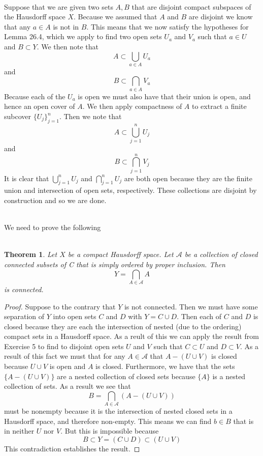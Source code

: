 \documentclass{article}
\newcommand{\problem}[1]{\noindent{\textbf{Problem #1}}\\}
\newtheorem*{thm}{\\ Theorem}
\begin{document}
\problem{3.26.5} Suppose that we are given two sets $A,B$ that are disjoint compact subspaces of the Hausdorff space $X$. Because we assumed that $A$ and $B$ are disjoint we know that any $a \in A$ is not in $B$. This means that we now satisfy the hypotheses for Lemma 26.4, which we apply to find two open sets $U_a$ and $V_a$ such that $a \in U$ and $B \subset Y$. We then note that 
\[
A \subset \bigcup_{a\in A} U_a
\]
and
\[
B \subset \bigcap_{a \in A} V_a
\]
Because each of the $U_a$ is open we must also have that their union is open, and hence an open cover of $A$. We then apply compactness of $A$ to extract a finite subcover $\{U_j\}_{j=1}^n$. Then we note that 
\[
A \subset \bigcup_{j=1}^n U_j
\] 
and 
\[
B \subset \bigcap_{j=1}^n V_j
\]
It is clear that $\bigcup_{j=1}^n U_j$ and $\bigcap_{j=1}^n U_j$ are both open because they are the finite union and intersection of open sets, respectively. These collections are disjoint by construction and so we are done. 

\problem{3.26.11} We need to prove the following
\begin{thm}
Let $X$ be a compact Hausdorff space. Let $\mathcal{A}$ be a collection of closed connected subsets of C that is simply ordered by proper inclusion. Then
\[
Y = \bigcap_{A \in \mathcal{A}} A
\]
is connected.
\end{thm}
\begin{proof}
Suppose to the contrary that $Y$ is not connected. Then we must have some separation of $Y$ into open sets $C$ and $D$ with $Y = C \cup D$. Then each of $C$ and $D$ is closed because they are each the intersection of nested (due to the ordering) compact sets in a Hausdorff space. As a reult of this we can apply the result from Exercise 5 to find to disjoint open sets $U$ and $V$ such that $C \subset U$ and $D \subset V$. As a result of this fact we must that for any $A \in \mathcal A$ that $A - (U \cup V)$ is closed because $U \cup  V$ is open and $A$ is closed. Furthermore, we have that the sets $\{A - (U\cup V)\}$ are a nested collection of closed sets because $\{A\}$ is a nested collection of sets. As a result we see that  
\[
B = \bigcap_{A \in \mathcal{A}} (A - (U\cup V))
\]
must be nonempty because it is the intersection of nested closed sets in a Hausdorff space, and therefore non-empty. This means we can find $b \in B$ that is in neither $U$ nor $V$. But this is impossible because  
\[
B \subset Y = (C \cup D) \subset (U \cup V)
\]
This contradiction establishes the result. 
\end{proof}
\end{document}
